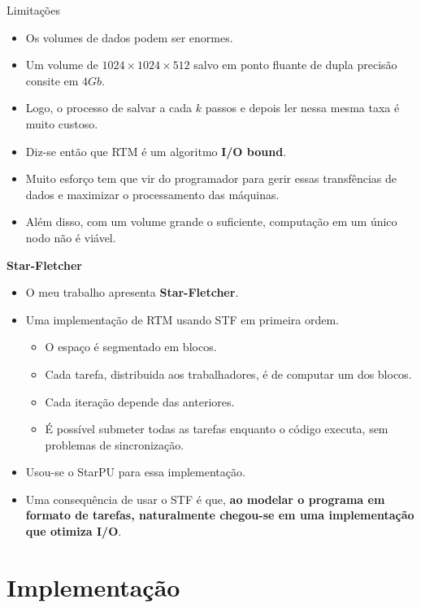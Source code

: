 \documentclass{beamer}
\newcommand{\starflet}{\textbf{Star-Fletcher}}
\begin{document}
\begin{frame}{Limitações}
  \begin{itemize}
  \item<+-> Os volumes de dados podem ser enormes.
  \item<+-> Um volume de $1024 \times 1024 \times 512$ salvo em ponto fluante de dupla precisão consite em $4Gb$.
  \item<+-> Logo, o processo de salvar a cada $k$ passos e depois ler nessa mesma taxa é muito custoso.
  \item<+-> Diz-se então que RTM é um algoritmo \textbf{I/O bound}.
  \item<+-> Muito esforço tem que vir do programador para gerir essas transfências de dados e maximizar o processamento das máquinas.
  \item<+-> Além disso, com um volume grande o suficiente, computação em um único nodo não é viável.
  \end{itemize}
\end{frame}


\begin{frame}{\starflet}
  \begin{itemize}
  \item<+-> O meu trabalho apresenta \starflet.
  \item<+-> Uma implementação de RTM usando STF em primeira ordem.
    \begin{itemize}
    \item<+-> O espaço é segmentado em blocos.
    \item<+-> Cada tarefa, distribuida aos trabalhadores, é de computar um dos blocos.
    \item<+-> Cada iteração depende das anteriores.
    \item<+-> É possível submeter todas as tarefas enquanto o código executa, sem problemas de sincronização.
    \end{itemize}
  \item<+-> Usou-se o StarPU para essa implementação.
    \item<+-> Uma consequência de usar o STF é que, \textbf{ao modelar o programa em formato de tarefas, naturalmente chegou-se em uma implementação que otimiza I/O}.
  \end{itemize}
\end{frame}


\section{Implementação}
\end{document}
